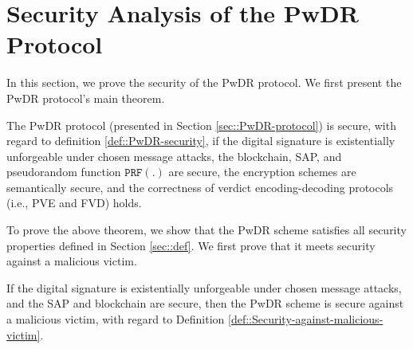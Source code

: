 

\section{Security Analysis of the PwDR Protocol}\label{sec::proof}

In this section, we prove the security of the PwDR protocol. We first present the PwDR protocol's main theorem. 


\begin{theorem}\label{theorem::PwDR-security}
The  PwDR protocol (presented in Section \ref{sec::PwDR-protocol}) is secure, with regard to definition \ref{def::PwDR-security}, if the digital signature is existentially unforgeable under chosen message attacks,  the blockchain, SAP, and pseudorandom function $\mathtt{PRF}(.)$ are secure,  the encryption schemes are semantically secure, and the correctness of verdict encoding-decoding protocols (i.e., PVE and FVD) holds. 
\end{theorem}






To prove the above  theorem, we show that the PwDR scheme satisfies all security properties defined in Section \ref{sec::def}. We first prove that it meets security against a malicious victim. 


\begin{lemma}\label{lemma::secure-against-a-malicious-victim} If the digital signature is existentially unforgeable under chosen message attacks, and the SAP and  blockchain are secure, then the PwDR scheme is secure against a malicious victim, with regard to Definition \ref{def::Security-against-malicious-victim}. 
\end{lemma}

